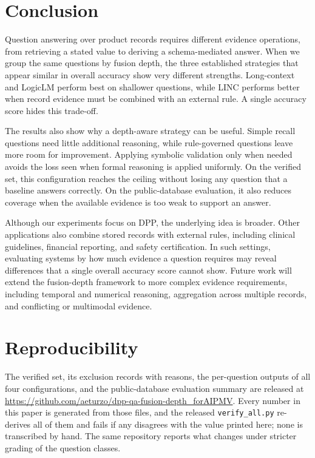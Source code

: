 \documentclass[conference]{IEEEtran}
\newcommand{\revg}[1]{\textcolor{reviewgreen}{#1}}
\begin{document}
\section{Conclusion}

\revg{Question answering over product records requires different evidence operations,
from retrieving a stated value to deriving a schema-mediated answer.} When we
group the same questions by fusion depth,
the three established strategies that appear similar in overall accuracy show very
different strengths. Long-context and LogicLM perform best on shallower
questions, while LINC performs better when record evidence must be combined
with an external rule. A single accuracy score hides this trade-off.

The results also show why a depth-aware strategy can be useful. Simple recall
questions need little additional reasoning, while rule-governed questions leave
more room for improvement. Applying symbolic validation only when needed
avoids the loss seen when formal reasoning is applied uniformly. On the verified
set, this configuration reaches the ceiling without losing any question that a
baseline answers correctly. On the public-database evaluation, it also reduces
coverage when the available evidence is too weak to support an answer.

Although our experiments focus on DPP, the underlying
idea is broader. Other applications also combine stored records with external
rules, including clinical guidelines, financial reporting, and safety
certification. In such settings, evaluating systems by how much evidence a
question requires may reveal differences that a single overall accuracy score
cannot show.
Future work will extend the fusion-depth framework to more complex evidence requirements, including temporal and numerical reasoning, aggregation across multiple records, and conflicting or multimodal evidence.


\section*{Reproducibility}

The verified set, its exclusion records with reasons, the per-question outputs
of all four configurations, and the public-database evaluation summary are
released at \url{https://github.com/aeturzo/dpp-qa-fusion-depth_forAIPMV}. Every number
in this paper is generated from those files, and the released
\texttt{verify\_all.py} re-derives all of them and fails if any disagrees with
the value printed here; none is transcribed by hand. The same repository
reports what changes under stricter grading of the question classes.
\end{document}
